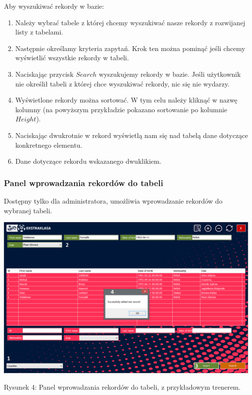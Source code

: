 \documentclass[12pt,a4paper]{article}
\begin{document}
    Aby wyszukiwać rekordy w bazie:
    \begin{enumerate}
        \item Należy wybrać tabele z której chcemy wyszukiwać nasze rekordy z rozwijanej listy z tabelami.
        \item Następnie określamy kryteria zapytań. Krok ten można pominąć jeśli chcemy wyświetlić wszystkie rekordy w tabeli.
        \item Naciskając przycisk $Search$ wyszukujemy rekordy w bazie. Jeśli użytkownik nie określił tabeli z której chce wyszukiwać rekordy, nic się nie wydarzy.
        \item Wyświetlone rekordy można sortować. W tym celu należy kliknąć w nazwę kolumny (na powyższym przykładzie pokazano sortowanie po kolumnie $Height$).
        \item Naciskając dwukrotnie w rekord wyświetlą nam się nad tabelą dane dotyczące konkretnego elementu.
        \item Dane dotyczące rekordu wskazanego dwuklikiem.
    \end{enumerate}
    
    \newpage
    
    \subsubsection{Panel wprowadzania rekordów do tabeli}
    Dostępny tylko dla administratora, umożliwia wprowadzanie rekordów do wybranej tabeli.
    \begin{center}
        \includegraphics[scale=0.47]{insert-panel.png}
        \begin{flushleft}
            \begin{scriptsize}
            \begin{list}{}{\leftmargin=13.5em}\raggedright\item\relax
            Rysunek 4: Panel wprowadzania rekordów do tabeli, z przykładowym trenerem.
            \end{list}
            \end{scriptsize}
        \end{flushleft}
    \end{center}
    
\end{document}
